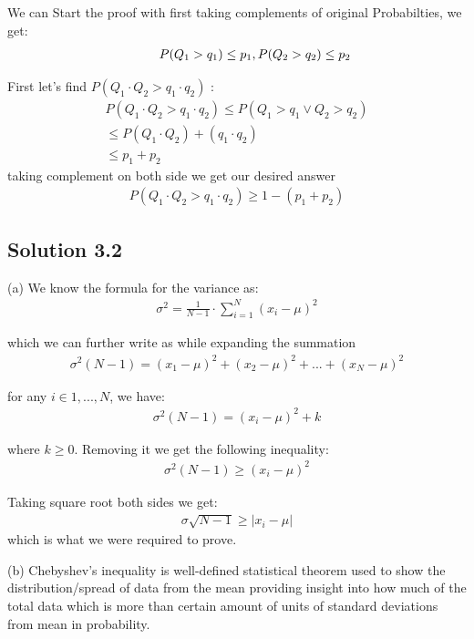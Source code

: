 \documentclass[fleqn]{article}
\begin{document}
We can Start the proof with first taking complements of original Probabilties, we get:
\begin{align*}
    \hspace{10 mm} P(Q_1 > q_1) \leq p_1,  P(Q_2 > q_2) \leq p_2
\end{align*}

First let's find $P(Q_1\cdot Q_2 > q_1\cdot q_2)$ :
\begin{align*}
    P(Q_1\cdot Q_2 > q_1\cdot q_2) \leq P(Q_1 > q_1 \vee Q_2 > q_2)
    \\\leq P(Q_1\cdot Q_2) + (q_1\cdot q_2)
    \\\leq p_1 + p_2
\end{align*}
taking complement on both side we get our desired answer
\begin{align*}
    P(Q_1\cdot Q_2 > q_1\cdot q_2) \geq 1 - (p_1 + p_2)
\end{align*}

\subsection{Solution 3.2}
(a) We know the formula for the variance as:
\begin{align*}
    \sigma^2 = \frac{1}{N-1} \cdot \sum_{i=1}^{N} (x_i - \mu)^2
\end{align*}

which we can further write as while expanding the summation
\begin{align*}
    \sigma^2 (N-1) = (x_1 - \mu)^2 + (x_2 - \mu)^2 + ... + (x_N - \mu)^2   
\end{align*}

for any $i \in {1,...,N}$, we have:
\begin{align*}
    \sigma^2 (N-1) = (x_i - \mu)^2 + k   
\end{align*}

where $k \geq 0$. Removing it we get the following inequality:
\begin{align*}
    \sigma^2 (N-1) \geq (x_i - \mu)^2
\end{align*}


Taking square root both sides we get:
\begin{align*}
    \sigma \sqrt{N-1} \geq |x_i - \mu|
\end{align*}
which is what we were required to prove.

(b) Chebyshev's inequality is well-defined statistical theorem used to show the distribution/spread of data from the mean providing insight into how much of the total data which is more than certain amount of units of standard deviations from mean in probability.
\end{document}
